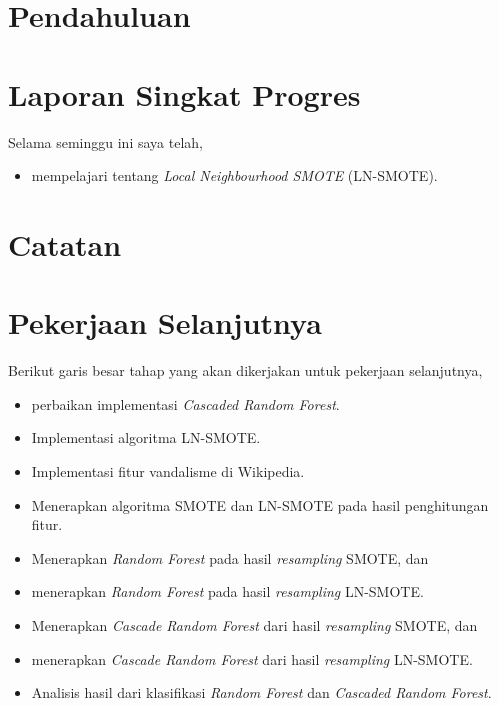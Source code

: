 






\section{Pendahuluan}

\section{Laporan Singkat Progres}

Selama seminggu ini saya telah,
\begin{itemize}
\item mempelajari tentang \textit{Local Neighbourhood SMOTE} (LN-SMOTE).
\end{itemize}

\section{Catatan}



\clearpage
\section{Pekerjaan Selanjutnya}

Berikut garis besar tahap yang akan dikerjakan untuk pekerjaan selanjutnya,

\begin{itemize}
\item perbaikan implementasi \textit{Cascaded Random Forest}.
\item Implementasi algoritma LN-SMOTE.
\item Implementasi fitur vandalisme di Wikipedia.
\item Menerapkan algoritma SMOTE dan LN-SMOTE pada hasil penghitungan fitur.
\item Menerapkan \textit{Random Forest} pada hasil \textit{resampling} SMOTE,
dan
\item menerapkan \textit{Random Forest} pada hasil \textit{resampling} LN-SMOTE.
\item Menerapkan \textit{Cascade Random Forest} dari hasil \textit{resampling}
SMOTE, dan
\item menerapkan \textit{Cascade Random Forest} dari hasil \textit{resampling}
LN-SMOTE.
\item Analisis hasil dari klasifikasi \textit{Random Forest} dan
\textit{Cascaded Random Forest}.
\end{itemize}

\clearpage
{}

\advisorsignature

\clearpage
{}
\printbibliography

\newpage
\appendix



